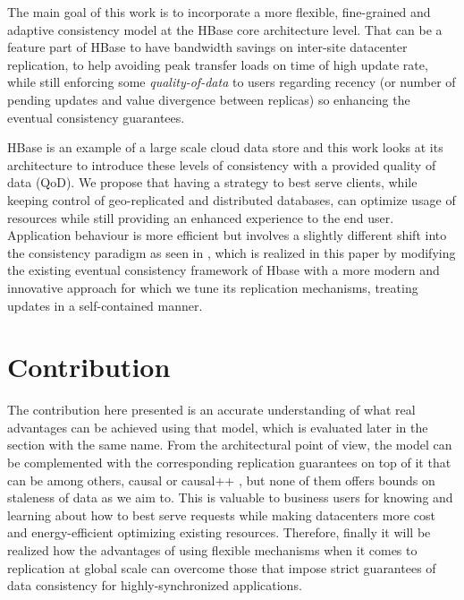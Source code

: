 The main goal of this work is to incorporate a more flexible, fine-grained and adaptive consistency model at the HBase core architecture level. That can be a feature part of HBase to have bandwidth savings on inter-site datacenter replication, to help avoiding peak transfer loads on time of high update rate, while still enforcing some \emph{quality-of-data} to users regarding recency (or number of pending updates and value divergence between replicas) so enhancing the eventual consistency guarantees.

HBase is an example of a large scale cloud data store and this work looks at its architecture to introduce these levels of consistency with a provided quality of data (QoD). We propose that having a strategy to best serve clients, while keeping control of geo-replicated and distributed databases, can optimize usage of resources while still providing an enhanced experience to the end user. Application behaviour is more efficient but involves a slightly different shift into the consistency paradigm as seen in \cite{Cooper:2008}, which is realized in this paper by modifying the existing eventual consistency framework of Hbase with a more modern and innovative approach for which we tune its replication mechanisms, treating updates in a self-contained manner. 



\section{Contribution}
The contribution here presented is an accurate understanding of what real advantages can be achieved using that model, which is evaluated later in the section with the same name.  From the architectural point of view, the model can be complemented with the corresponding replication guarantees on top of it that can be among others, causal or causal++ , but none of them offers bounds on staleness of data as we aim to. This is valuable to business users for knowing and learning about how to best serve requests while making datacenters more cost and energy-efficient optimizing existing resources. Therefore, finally it will be realized how the advantages of using flexible mechanisms when it comes to replication at global scale can overcome those that impose strict guarantees of data consistency for highly-synchronized applications. 


